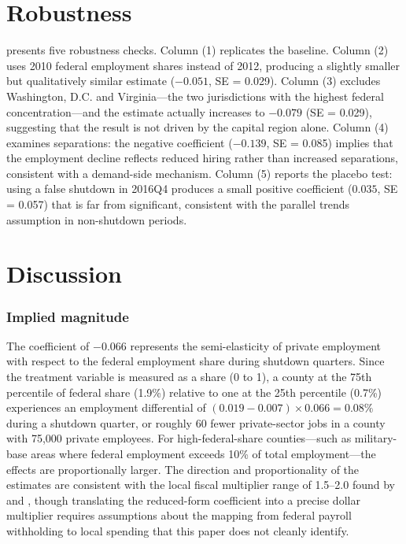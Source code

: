 \documentclass[12pt]{article}
\begin{document}


\section{Robustness}

 presents five robustness checks. Column (1) replicates the baseline. Column (2) uses 2010 federal employment shares instead of 2012, producing a slightly smaller but qualitatively similar estimate ($-0.051$, SE = 0.029). Column (3) excludes Washington, D.C. and Virginia---the two jurisdictions with the highest federal concentration---and the estimate actually increases to $-0.079$ (SE = 0.029), suggesting that the result is not driven by the capital region alone. Column (4) examines separations: the negative coefficient ($-0.139$, SE = 0.085) implies that the employment decline reflects reduced hiring rather than increased separations, consistent with a demand-side mechanism. Column (5) reports the placebo test: using a false shutdown in 2016Q4 produces a small positive coefficient ($0.035$, SE = 0.057) that is far from significant, consistent with the parallel trends assumption in non-shutdown periods.

{\footnotesize}

\section{Discussion}

\subsubsection*{Implied magnitude} The coefficient of $-0.066$ represents the semi-elasticity of private employment with respect to the federal employment share during shutdown quarters. Since the treatment variable is measured as a share (0 to 1), a county at the 75th percentile of federal share (1.9\%) relative to one at the 25th percentile (0.7\%) experiences an employment differential of $(0.019 - 0.007) \times 0.066 = 0.08\%$ during a shutdown quarter, or roughly 60 fewer private-sector jobs in a county with 75,000 private employees. For high-federal-share counties---such as military-base areas where federal employment exceeds 10\% of total employment---the effects are proportionally larger. The direction and proportionality of the estimates are consistent with the local fiscal multiplier range of 1.5--2.0 found by \citet{chodorow2019geographic} and \citet{wilson2012fiscal}, though translating the reduced-form coefficient into a precise dollar multiplier requires assumptions about the mapping from federal payroll withholding to local spending that this paper does not cleanly identify.
\end{document}
